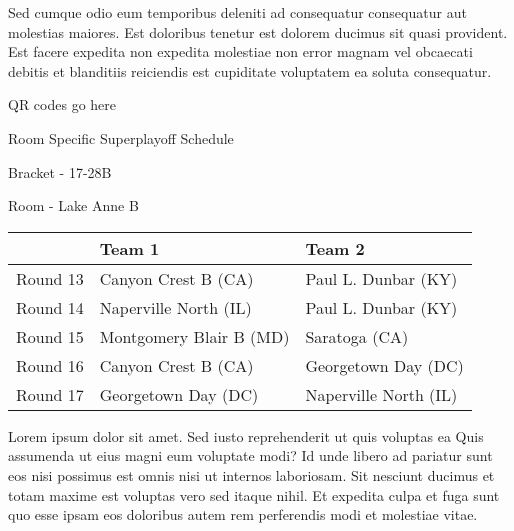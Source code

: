 \documentclass{article}%
\begin{document}
\newline%
Sed cumque odio eum temporibus deleniti ad consequatur consequatur aut molestias maiores. Est doloribus tenetur est dolorem ducimus sit quasi provident. Est facere expedita non expedita molestiae non error magnam vel obcaecati debitis et blanditiis reiciendis est cupiditate voluptatem ea soluta consequatur.%
\vspace*{140pt}%
\begin{center}%
\begin{Huge}%
QR codes go here%
\end{Huge}%
\end{center}%
\newpage%
\begin{center}%
\begin{Huge}%
Room Specific Superplayoff Schedule%
\end{Huge}%
\vspace*{8pt}%
\linebreak%
\begin{Large}%
Bracket {-} 17{-}28B%
\end{Large}%
\vspace*{8pt}%
\linebreak%
\vspace*{8pt}%
\begin{Large}%
Room {-} Lake Anne B%
\end{Large}%
\end{center}%
%
\begin{tabularx}{\textwidth}{|c|Y|Y|}%
\hline%
&Team 1&Team 2\\%
\hline%
Round 13&Canyon Crest B (CA)&Paul L. Dunbar (KY)\\%
Round 14&Naperville North (IL)&Paul L. Dunbar (KY)\\%
Round 15&Montgomery Blair B (MD)&Saratoga (CA)\\%
Round 16&Canyon Crest B (CA)&Georgetown Day (DC)\\%
Round 17&Georgetown Day (DC)&Naperville North (IL)\\%
\hline%
\end{tabularx}%
\vspace*{8pt}%
\newline%
Lorem ipsum dolor sit amet. Sed iusto reprehenderit ut quis voluptas ea Quis assumenda ut eius magni eum voluptate modi? Id unde libero ad pariatur sunt eos nisi possimus est omnis nisi ut internos laboriosam. Sit nesciunt ducimus et totam maxime est voluptas vero sed itaque nihil. Et expedita culpa et fuga sunt quo esse ipsam eos doloribus autem rem perferendis modi et molestiae vitae.\newline%
\end{document}
